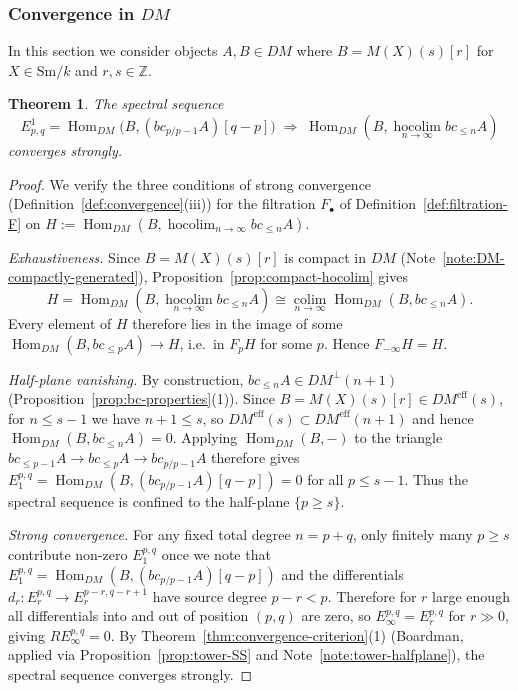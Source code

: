 \documentclass[12pt,a4paper]{article}
\newtheorem{theorem}{Theorem}[section]
\theoremstyle{definition}
\newcommand{\Sm}{\mathrm{Sm}}
\newcommand{\hocolim}{\operatorname*{hocolim}}
\newcommand{\colim}{\operatorname*{colim}}
\newcommand{\Hom}{\operatorname{Hom}}
\newcommand{\Z}{\mathbb{Z}}
\begin{document}
\subsubsection{Convergence in $DM$}

In this section we consider objects $A,B\in DM$ where $B=M(X)(s)[r]$ for
$X\in\Sm/k$ and $r,s\in\Z$.

\begin{theorem}\label{thm:DM-strong-convergence}
The spectral sequence
\[
  E^1_{p,q} = \Hom_{DM}\!\bigl(B,(bc_{p/p-1}A)[q-p]\bigr)
  \;\Rightarrow\; \Hom_{DM}(B,\hocolim_{n\to\infty}bc_{\leq n}A)
\]
converges strongly.
\end{theorem}
\begin{proof}
We verify the three conditions of strong convergence
(Definition~\ref{def:convergence}(iii)) for the filtration $F_\bullet$ of
Definition~\ref{def:filtration-F} on $H:=\Hom_{DM}(B,\hocolim_{n\to\infty}bc_{\leq n}A)$.

\textit{Exhaustiveness.}  Since $B=M(X)(s)[r]$ is compact in $DM$
(Note~\ref{note:DM-compactly-generated}), Proposition~\ref{prop:compact-hocolim} gives
\[
  H = \Hom_{DM}(B,\hocolim_{n\to\infty}bc_{\leq n}A)
  \cong \colim_{n\to\infty}\Hom_{DM}(B,bc_{\leq n}A).
\]
Every element of $H$ therefore lies in the image of some
$\Hom_{DM}(B,bc_{\leq p}A)\to H$, i.e.\ in $F_p H$ for some $p$.
Hence $F_{-\infty}H = H$.

\textit{Half-plane vanishing.}  By construction,
$bc_{\leq n}A\in DM^\perp(n+1)$ (Proposition~\ref{prop:bc-properties}(1)).
Since $B=M(X)(s)[r]\in DM^{\mathrm{eff}}(s)$, for $n\leq s-1$ we have
$n+1\leq s$, so $DM^{\mathrm{eff}}(s)\subset DM^{\mathrm{eff}}(n+1)$ and hence
$\Hom_{DM}(B, bc_{\leq n}A)=0$.
Applying $\Hom_{DM}(B,-)$ to the triangle
$bc_{\leq p-1}A\to bc_{\leq p}A\to bc_{p/p-1}A$ therefore gives
$E_1^{p,q}=\Hom_{DM}(B,(bc_{p/p-1}A)[q-p])=0$ for all $p\leq s-1$.
Thus the spectral sequence is confined to the half-plane $\{p\geq s\}$.

\textit{Strong convergence.}  For any fixed total degree $n=p+q$, only finitely
many $p\geq s$ contribute non-zero $E_1^{p,q}$ once we note that
$E_1^{p,q}=\Hom_{DM}(B,(bc_{p/p-1}A)[q-p])$ and the differentials
$d_r:E_r^{p,q}\to E_r^{p-r,q-r+1}$ have source degree $p-r<p$.  Therefore for
$r$ large enough all differentials into and out of position $(p,q)$ are zero, so
$E_\infty^{p,q}=E_r^{p,q}$ for $r\gg 0$, giving $RE_\infty^{p,q}=0$.
By Theorem~\ref{thm:convergence-criterion}(1) (Boardman, applied via
Proposition~\ref{prop:tower-SS} and Note~\ref{note:tower-halfplane}), the spectral
sequence converges strongly.
\end{proof}
\end{document}
